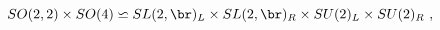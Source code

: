 \begin{equation}
SO(2,2) \times SO(4) \backsimeq SL(2,\br)_L \times SL(2,\br)_R \times
SU(2)_L \times SU(2)_R ~, 
\end{equation}

